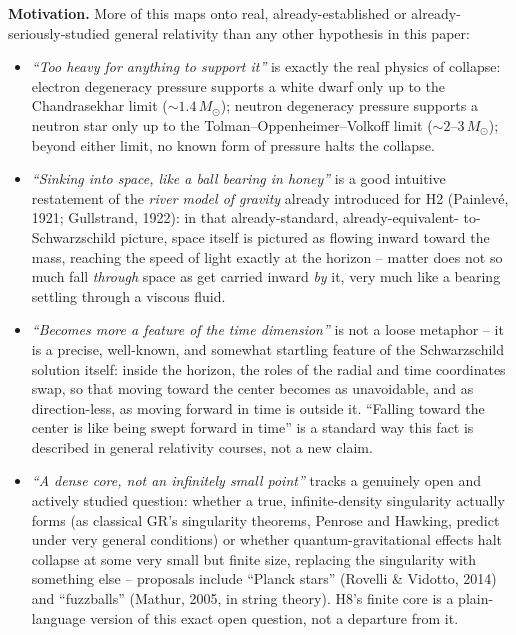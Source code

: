 \documentclass[12pt, a4paper]{article}
\begin{document}
\textbf{Motivation.} More of this maps onto real, already-established
or already-seriously-studied general relativity than any other
hypothesis in this paper:
\begin{itemize}
  \item \emph{``Too heavy for anything to support it''} is exactly
    the real physics of collapse: electron degeneracy pressure
    supports a white dwarf only up to the Chandrasekhar limit
    ($\sim1.4\,M_\odot$); neutron degeneracy pressure supports a
    neutron star only up to the Tolman--Oppenheimer--Volkoff limit
    ($\sim2$--$3\,M_\odot$); beyond either limit, no known form of
    pressure halts the collapse.
  \item \emph{``Sinking into space, like a ball bearing in honey''}
    is a good intuitive restatement of the \emph{river model of
    gravity} already introduced for H2 (Painlev\'e, 1921;
    Gullstrand, 1922): in that already-standard, already-equivalent-
    to-Schwarzschild picture, space itself is pictured as flowing
    inward toward the mass, reaching the speed of light exactly at
    the horizon -- matter does not so much fall \emph{through} space
    as get carried inward \emph{by} it, very much like a bearing
    settling through a viscous fluid.
  \item \emph{``Becomes more a feature of the time dimension''} is not
    a loose metaphor -- it is a precise, well-known, and somewhat
    startling feature of the Schwarzschild solution itself: inside
    the horizon, the roles of the radial and time coordinates swap,
    so that moving toward the center becomes as unavoidable, and as
    direction-less, as moving forward in time is outside it. ``Falling
    toward the center is like being swept forward in time'' is a
    standard way this fact is described in general relativity
    courses, not a new claim.
  \item \emph{``A dense core, not an infinitely small point''} tracks
    a genuinely open and actively studied question: whether a true,
    infinite-density singularity actually forms (as classical GR's
    singularity theorems, Penrose and Hawking, predict under very
    general conditions) or whether quantum-gravitational effects halt
    collapse at some very small but finite size, replacing the
    singularity with something else -- proposals include ``Planck
    stars'' (Rovelli \& Vidotto, 2014) and ``fuzzballs'' (Mathur,
    2005, in string theory). H8's finite core is a plain-language
    version of this exact open question, not a departure from it.
\end{itemize}
\end{document}
